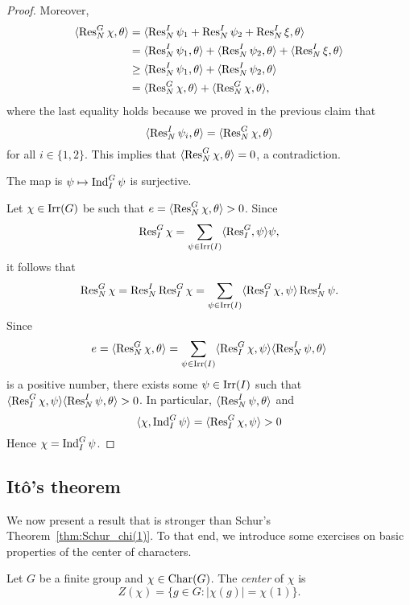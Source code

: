 \begin{proof}
    Moreover, 
    \begin{align*}
        \langle\operatorname{Res}_N^G\chi,\theta\rangle &= \langle\operatorname{Res}_N^I\psi_1+\operatorname{Res}_N^I\psi_2+\operatorname{Res}_N^I\xi,\theta\rangle\\
        &=\langle\operatorname{Res}_N^I\psi_1,\theta\rangle+\langle\operatorname{Res}_N^I\psi_2,\theta\rangle+\langle\operatorname{Res}_N^I\xi,\theta\rangle\\
&\geq\langle\operatorname{Res}_N^I\psi_1,\theta\rangle+\langle\operatorname{Res}_N^I\psi_2,\theta\rangle\\
        &=\langle\operatorname{Res}_N^G\chi,\theta\rangle+\langle\operatorname{Res}_N^G\chi,\theta\rangle,
    \end{align*}
    where the last equality holds because we proved in the previous claim that 
    \[
        \langle\operatorname{Res}_N^I\psi_i,\theta\rangle=\langle\operatorname{Res}_N^G\chi,\theta\rangle
    \]
    for all $i\in\{1,2\}$. 
    This implies that $\langle\operatorname{Res}_N^G\chi,\theta\rangle=0$, a contradiction. 

    \begin{claim}
        The map is $\psi\mapsto\operatorname{Ind}_I^G\psi$ is surjective. 
    \end{claim}

    Let $\chi\in\operatorname{Irr}(G)$ be such that 
    $e=\langle\operatorname{Res}_N^G\chi,\theta\rangle>0$. Since 
    \[
    \operatorname{Res}_I^G\chi=\sum_{\psi\in\operatorname{Irr}(I)}\langle\operatorname{Res}_I^G,\psi\rangle\psi,
    \]
    it follows that 
    \[
    \operatorname{Res}_N^G\chi=\operatorname{Res}_N^I\operatorname{Res}_I^G\chi
    =\sum_{\psi\in\operatorname{Irr}(I)}\langle\operatorname{Res}_I^G\chi,\psi\rangle\operatorname{Res}_N^I\psi.
    \]
    Since 
    \[
    e=\langle\operatorname{Res}_N^G\chi,\theta\rangle=
    \sum_{\psi\in\operatorname{Irr}(I)}\langle\operatorname{Res}_I^G\chi,\psi\rangle\langle\operatorname{Res}_N^I\psi,\theta\rangle
    \]
    is a positive number, there exists some $\psi\in\operatorname{Irr}(I)$ 
    such that $\langle\operatorname{Res}_I^G\chi,\psi\rangle\langle\operatorname{Res}_N^I\psi,\theta\rangle>0$. In particular, $\langle\operatorname{Res}_N^I\psi,\theta\rangle$ and 
    \[
    \langle\chi,\operatorname{Ind}_I^G\psi\rangle=\langle\operatorname{Res}_I^G\chi,\psi\rangle>0
    \]
    Hence $\chi=\operatorname{Ind}_I^G\psi$. 
\end{proof}

\subsection{It\^o's theorem}

We now present a result that is stronger than Schur’s Theorem~\ref{thm:Schur_chi(1)}.
To that end, we introduce some exercises on basic properties of the center of characters.

\begin{definition}
    Let $G$ be a finite group and $\chi\in\operatorname{Char}(G)$. 
    The \emph{center} of $\chi$ is
    \[
    Z(\chi)=\{g\in G:|\chi(g)|=\chi(1)\}.
    \]
\end{definition}

